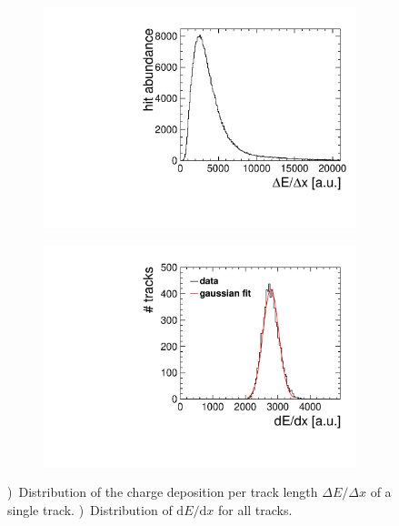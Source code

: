 \begin{figure}[htb!]
\begin{subfigure}[b]{0.48\textwidth}
\includegraphics[width=\textwidth]{Tracker/TPC_Bonn/plots/TPC-DG_dEdxHitDist_v2.pdf}
\caption{}
\label{sfig:dedx_distr}
\end{subfigure}
\begin{subfigure}[b]{0.48\textwidth}
\includegraphics[width=\textwidth]{Tracker/TPC_Bonn/plots/TPC-DG_dEdxMeanDist_v2.pdf}
\caption{}
\label{sfig:dedx_mean}
\end{subfigure}
\caption{\small
  \protect{})~Distribution of the charge deposition per track length $\Delta E / \Delta x$ of a single track.
  \protect{})~Distribution of \ensuremath{\mathrm{d}E/\mathrm{d}x} for all tracks.
}
\label{fig:dedx_distributions}
\end{figure}

